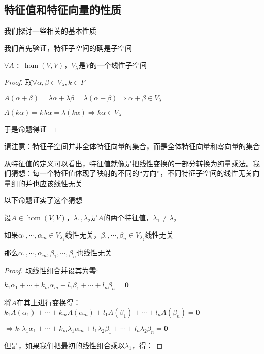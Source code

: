 \documentclass[12pt, a4paper, oneside, UTF8]{ctexbook}
\begin{document}
		\subsection{特征值和特征向量的性质}
			我们探讨一些相关的基本性质
			\begin{para}{0}
				\point{}

					我们首先验证，特征子空间的确是子空间
					\begin{proposition}
						$\forall A \in \hom(V,V)$，$V_\lambda $是$V$的一个线性子空间
					\end{proposition}
					\begin{proof}
						取$\forall \alpha ,\beta \in V_\lambda ,k \in F$

						$A(\alpha +\beta )=\lambda \alpha +\lambda \beta =\lambda (\alpha +\beta ) \Rightarrow \alpha +\beta \in V_\lambda $

						$A(k\alpha )=k\lambda \alpha =\lambda (k\alpha )\Rightarrow k\alpha \in V_\lambda $

						于是命题得证
					\end{proof}
					请注意：特征子空间并非全体特征向量的集合，而是全体特征向量和零向量的集合
				\point{}
					
					从特征值的定义可以看出，特征值就像是把线性变换的一部分转换为纯量乘法。我们猜想：每一个特征值体现了映射的不同的“方向”，不同特征子空间的线性无关向量组的并也应该线性无关

					以下命题证实了这个猜想
					\begin{proposition}
						设$A \in \hom(V,V)$，$\lambda_1,\lambda_2$是$A$的两个特征值，$\lambda_1\neq \lambda_2$

						如果$\alpha_1,\cdots,\alpha_m \in V_{\lambda_1}$线性无关，$\beta_1,\cdots,\beta_n \in V_{\lambda_2}$线性无关

						那么$\alpha_1,\cdots,\alpha_m,\beta_1,\cdots,\beta_n$也线性无关
					\end{proposition}
					\begin{proof}
						取线性组合并设其为零:

						$k_1\alpha_1+\cdots+k_m\alpha_m+l_1\beta_1+\cdots+l_n\beta_n=\mathbf{0}$

						将$A$在其上进行变换得：$k_1A(\alpha_1)+\cdots+k_mA(\alpha_m)+l_1A(\beta_1)+\cdots+l_nA(\beta_n)=\mathbf{0}$

						$\Rightarrow k_1\lambda_1\alpha_1 +\cdots+k_m\lambda_1\alpha_m+l_1\lambda_2\beta_1+\cdots+l_n\lambda_2\beta_n=\mathbf{0}$

						但是，如果我们把最初的线性组合乘以$\lambda_1$，得：


\end{proof}
\end{para}
\end{document}
